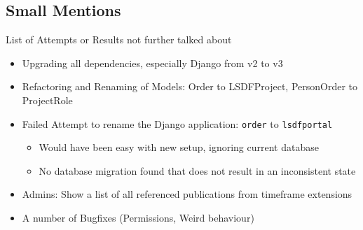 \subsection{Small Mentions}
\begin{frame}[c,fragile]{List of Attempts or Results not further talked about}
    \large
    \begin{itemize}[<+(1)->]
        \item Upgrading all dependencies, especially Django from v2 to v3
        \item Refactoring and Renaming of Models: Order to LSDFProject, PersonOrder to ProjectRole
        \item Failed Attempt to rename the Django application: \verb!order! to \verb!lsdfportal!
            \begin{itemize}[<+(1)->]
                \item Would have been easy with new setup, ignoring current database
                \item No database migration found that does not result in an inconsistent state
            \end{itemize}
        \item Admins: Show a list of all referenced publications from timeframe extensions
        \item A number of Bugfixes (Permissions, Weird behaviour)
    \end{itemize}
\end{frame}



% 
